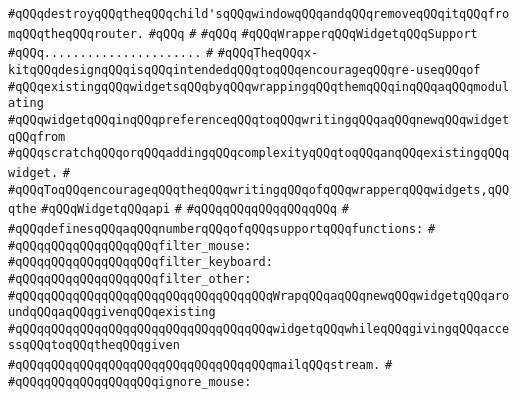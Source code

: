 \verb|#qQQqdestroyqQQqtheqQQqchild'sqQQqwindowqQQqandqQQqremoveqQQqitqQQqfromqQQqtheqQQqrouter.|\newline
\verb|#qQQq|\newline
\verb|#|\newline
\verb|#qQQq|\newline
\verb|#qQQqWrapperqQQqWidgetqQQqSupport|\newline
\verb|#qQQq......................|\newline
\verb|#|\newline
\verb|#qQQqTheqQQqx-kitqQQqdesignqQQqisqQQqintendedqQQqtoqQQqencourageqQQqre-useqQQqof|\newline
\verb|#qQQqexistingqQQqwidgetsqQQqbyqQQqwrappingqQQqthemqQQqinqQQqaqQQqmodulating|\newline
\verb|#qQQqwidgetqQQqinqQQqpreferenceqQQqtoqQQqwritingqQQqaqQQqnewqQQqwidgetqQQqfrom|\newline
\verb|#qQQqscratchqQQqorqQQqaddingqQQqcomplexityqQQqtoqQQqanqQQqexistingqQQqwidget.|\newline
\verb|#|\newline
\verb|#qQQqToqQQqencourageqQQqtheqQQqwritingqQQqofqQQqwrapperqQQqwidgets,qQQqthe|\newline
\verb|#qQQqWidgetqQQqapi|\newline
\verb|#|\newline
\verb|#qQQqqQQqqQQqqQQqqQQq|\newline
\verb|#|\newline
\verb|#qQQqdefinesqQQqaqQQqnumberqQQqofqQQqsupportqQQqfunctions:|\newline
\verb|#|\newline
\verb|#qQQqqQQqqQQqqQQqqQQqfilter_mouse:|\newline
\verb|#qQQqqQQqqQQqqQQqqQQqfilter_keyboard:|\newline
\verb|#qQQqqQQqqQQqqQQqqQQqfilter_other:|\newline
\verb|#qQQqqQQqqQQqqQQqqQQqqQQqqQQqqQQqqQQqWrapqQQqaqQQqnewqQQqwidgetqQQqaroundqQQqaqQQqgivenqQQqexisting|\newline
\verb|#qQQqqQQqqQQqqQQqqQQqqQQqqQQqqQQqqQQqwidgetqQQqwhileqQQqgivingqQQqaccessqQQqtoqQQqtheqQQqgiven|\newline
\verb|#qQQqqQQqqQQqqQQqqQQqqQQqqQQqqQQqqQQqmailqQQqstream.|\newline
\verb|#|\newline
\verb|#qQQqqQQqqQQqqQQqqQQqignore_mouse:|\newline

